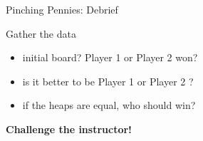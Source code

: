 \documentclass{beamer}
\begin{document}
\begin{frame}{Pinching Pennies: Debrief}
  \begin{block}{Gather the data}
    \begin{itemize}
      \item initial board? {\color{blue}Player 1} or {\color{green}Player 2} won?
      \item is it better to be {\color{blue}Player 1} or {\color{green}Player 2} ?
      \item if the heaps are equal, who should win?
    \end{itemize}
  \end{block}
\begin{center}
\textbf{Challenge the instructor!}
\end{center}
\end{frame}
\end{document}
